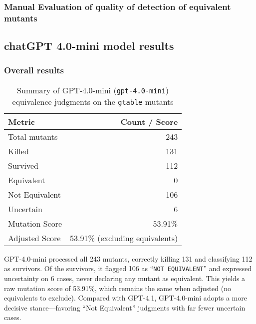 \subsubsection{Manual Evaluation of quality of detection of equivalent mutants}



\subsection{chatGPT 4.0-mini model results}

\subsubsection{Overall results}

\begin{table}[ht]
  \centering
  \begin{tabular}{lr}
    \hline\hline
    \textbf{Metric}        & \textbf{Count / Score}       \\
    \hline
    Total mutants          & 243                          \\
    Killed                 & 131                          \\
    Survived               & 112                          \\
    Equivalent             & 0                            \\
    Not Equivalent         & 106                          \\
    Uncertain              & 6                            \\
    Mutation Score         & 53.91\%                      \\
    Adjusted Score         & 53.91\% (excluding equivalents) \\
    \hline
  \end{tabular}
  \caption{Summary of GPT-4.0-mini (\texttt{gpt-4.0-mini}) equivalence judgments on the \texttt{gtable} mutants}
  \label{tab:gpt40mini-overall}
\end{table}

GPT-4.0-mini processed all 243 mutants, correctly killing 131 and classifying 112 as survivors.  Of the survivors, it flagged 106 as “\texttt{NOT EQUIVALENT}” and expressed uncertainty on 6 cases, never declaring any mutant as equivalent.  This yields a raw mutation score of 53.91\%, which remains the same when adjusted (no equivalents to exclude).  Compared with GPT-4.1, GPT-4.0-mini adopts a more decisive stance—favoring “Not Equivalent” judgments with far fewer uncertain cases. 

